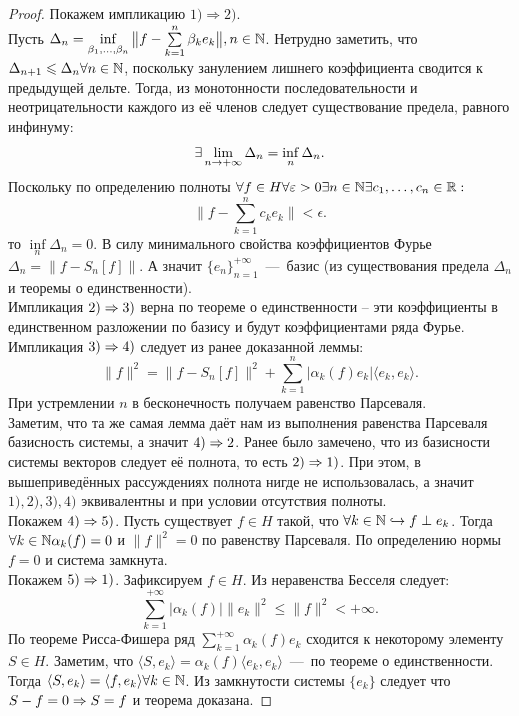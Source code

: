 \begin{proof}
    Покажем импликацию $1) \Rightarrow 2)$. \\
    Пусть $\Delta_n = \inf\limits_{\beta_1, \ldots, \beta_n} \big\|f - \sum\limits_{k = 1}^n \beta_k e_k \big\|, n \in \mathbb{N}$.
    Нетрудно заметить, что $\Delta_{n + 1} \leqslant \Delta_n \forall n \in \mathbb{N}$, поскольку занулением лишнего коэффициента сводится к предыдущей дельте.
    Тогда, из монотонности последовательности и неотрицательности каждого из её членов следует существование предела, равного инфинуму:
    \[
        \exists \lim\limits_{n \rightarrow +\infty} \Delta_n = \inf\limits_n \Delta_n.
    \]
    Поскольку по определению полноты $\forall f \in H \forall \varepsilon > 0 \exists n \in \mathbb{N} \exists c_1, \ldots, c_n \in \mathbb{R}:$
    \[
        \|f - \sum\limits_{k = 1}^n c_k e_k\| < \epsilon.
    \]
    то $\inf\limits_n \Delta_n = 0$.
    В силу минимального свойства коэффициентов Фурье $\Delta_n = \|f - S_n[f]\|$.
    А значит $\{e_n\}_{n = 1}^{+\infty}$~---~базис (из существования предела $\Delta_n$ и теоремы о единственности). \\
    Импликация $2) \Rightarrow 3)$ верна по теореме о единственности -- эти коэффициенты в единственном разложении по базису и будут коэффициентами ряда Фурье. \\
    Импликация $3) \Rightarrow 4)$ следует из ранее доказанной леммы:
    \[
        \|f\|^2 = \|f - S_n[f]\|^2 + \sum\limits_{k = 1}^n |\alpha_k(f) e_k|\langle e_k, e_k \rangle.
    \]
    При устремлении $n$ в бесконечность получаем равенство Парсеваля. \\
    Заметим, что та же самая лемма даёт нам из выполнения равенства Парсеваля базисность системы, а значит $4) \Rightarrow 2$.
    Ранее было замечено, что из базисности системы векторов следует её полнота, то есть $2) \Rightarrow 1)$.
    При этом, в вышеприведённых рассуждениях полнота нигде не использовалась, а значит $1), 2), 3), 4)$ эквивалентны и при условии отсутствия полноты. \\
    Покажем $4) \Rightarrow 5)$.
    Пусть существует $f \in H$ такой, что $\forall k \in \mathbb{N} \hookrightarrow f \perp e_k$.
    Тогда $\forall k \in \mathbb{N} \alpha_k(f) = 0$ и $\|f\|^2 = 0$ по равенству Парсеваля.
    По определению нормы $f = 0$ и система замкнута. \\
    Покажем $5) \Rightarrow 1)$.
    Зафиксируем $f \in H$.
    Из неравенства Бесселя следует:
    \[
        \sum\limits_{k = 1}^{+\infty} |\alpha_k(f)|\|e_k\|^2 \leq \|f\|^2 < +\infty.
    \]
    По теореме Рисса-Фишера ряд $\sum\limits_{k = 1}^{+\infty} \alpha_k(f) e_k$ сходится к некоторому элементу $S \in H$.
    Заметим, что $\langle S, e_k \rangle = \alpha_k(f) \langle e_k, e_k \rangle$~---~по теореме о единственности.
    Тогда $\langle S, e_k \rangle = \langle f, e_k \rangle \forall k \in \mathbb{N}$.
    Из замкнутости системы $\{e_k\}$ следует что $S - f = 0 \Rightarrow S = f$ и теорема доказана.
\end{proof}
